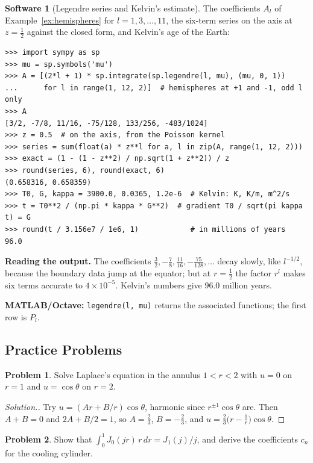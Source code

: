 \documentclass[11pt,a4paper]{article}
\numberwithin{equation}{section}
\theoremstyle{definition}
\newtheorem{software}[thm]{Software}
\newtheorem{problemx}{Problem}[subsection]
\newenvironment{problem}{\begin{problemx}}{\end{problemx}}
\newenvironment{solution}
  {\renewcommand{\qedsymbol}{}\begin{proof}[\textit{Solution}.]}
  {\end{proof}}
\begin{document}
\begin{software}[Legendre series and Kelvin's estimate]
\label{sw:legendre}
The coefficients $A_l$ of Example~\ref{ex:hemispheres} for $l = 1, 3, \ldots, 11$, the six-term series on the axis at $z = \frac12$ against the closed form, and Kelvin's age of the Earth:
{\small\begin{verbatim}
>>> import sympy as sp
>>> mu = sp.symbols('mu')
>>> A = [(2*l + 1) * sp.integrate(sp.legendre(l, mu), (mu, 0, 1))
...      for l in range(1, 12, 2)]  # hemispheres at +1 and -1, odd l only
>>> A
[3/2, -7/8, 11/16, -75/128, 133/256, -483/1024]
>>> z = 0.5  # on the axis, from the Poisson kernel
>>> series = sum(float(a) * z**l for a, l in zip(A, range(1, 12, 2)))
>>> exact = (1 - (1 - z**2) / np.sqrt(1 + z**2)) / z
>>> round(series, 6), round(exact, 6)
(0.658316, 0.658359)
>>> T0, G, kappa = 3900.0, 0.0365, 1.2e-6  # Kelvin: K, K/m, m^2/s
>>> t = T0**2 / (np.pi * kappa * G**2)  # gradient T0 / sqrt(pi kappa t) = G
>>> round(t / 3.156e7 / 1e6, 1)            # in millions of years
96.0
\end{verbatim}}
\textbf{Reading the output.} The coefficients $\frac32, -\frac78, \frac{11}{16}, -\frac{75}{128}, \ldots$ decay slowly, like $l^{-1/2}$, because the boundary data jump at the equator; but at $r = \frac12$ the factor $r^l$ makes six terms accurate to $4 \times 10^{-5}$. Kelvin's numbers give $96.0$ million years.

\textbf{MATLAB/Octave:} \texttt{legendre(l, mu)} returns the associated functions; the first row is $P_l$.
\end{software}

\subsection{Practice Problems}

\begin{problem}
Solve Laplace's equation in the annulus $1 < r < 2$ with $u = 0$ on $r = 1$ and $u = \cos\theta$ on $r = 2$.
\end{problem}

\begin{solution}
Try $u = (Ar + B/r)\cos\theta$, harmonic since $r^{\pm1}\cos\theta$ are. Then $A + B = 0$ and $2A + B/2 = 1$, so $A = \frac23$, $B = -\frac23$, and $u = \frac23\bigl(r - \frac1r\bigr)\cos\theta$.
\end{solution}

\begin{problem}
Show that $\int_0^1J_0(jr)\,r\,dr = J_1(j)/j$, and derive the coefficients $c_n$ for the cooling cylinder.
\end{problem}
\end{document}
